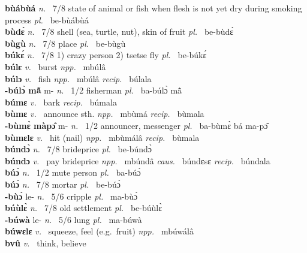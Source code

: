 {\bfseries bùábùá}  {\itshape n.~} 7/8 state of animal or fish when flesh is not yet dry during smoking process {\itshape pl.~}  be-bùábùá \\ 
{\bfseries bùdɛ́}  {\itshape n.~} 7/8 shell (sea, turtle, nut), skin of fruit {\itshape pl.~} be-bùdɛ́    \\ 
{\bfseries bùgù}  {\itshape n.~} 7/8 place {\itshape pl.~} be-bùgù    \\ 
{\bfseries búkɛ́}  {\itshape n.~} 7/8 1) crazy person 2) tsetse fly {\itshape pl.~} be-búkɛ́    \\ 
{\bfseries búlɛ}  {\itshape v.~} burst   {\itshape npp.~} mbúlâ  \\ 
{\bfseries búlɔ}  {\itshape v.~} fish   {\itshape npp.~} mbúlâ {\itshape recip.~} búlala  \\ 
{\bfseries -búlɔ̀ mã̂} m- {\itshape n.~} 1/2 fisherman {\itshape pl.~} ba-búlɔ̀ mã̂    \\ 
{\bfseries búmɛ}  {\itshape v.~} bark   {\itshape recip.~} búmala  \\ 
{\bfseries bùmɛ}  {\itshape v.~} announce sth.   {\itshape npp.~} mbùmá {\itshape recip.~} bùmala  \\ 
{\bfseries -bùmɛ̀ màpɔ̂} m- {\itshape n.~} 1/2 announcer, messenger {\itshape pl.~} ba-bùmɛ̀ bá ma-pɔ̂    \\ 
{\bfseries bùmɛlɛ}  {\itshape v.~} hit (nail)   {\itshape npp.~} mbùmálâ {\itshape recip.~} bùmala  \\ 
{\bfseries búndɔ̀}  {\itshape n.~} 7/8 brideprice {\itshape pl.~} be-búndɔ̀    \\ 
{\bfseries búndɔ}  {\itshape v.~} pay brideprice   {\itshape npp.~} mbúndâ {\itshape caus.~} búndɛsɛ {\itshape recip.~} búndala  \\ 
{\bfseries búɔ̀}  {\itshape n.~} 1/2 mute person {\itshape pl.~} ba-búɔ̀    \\ 
{\bfseries búɔ̀}  {\itshape n.~} 7/8 mortar {\itshape pl.~} be-búɔ̀    \\ 
{\bfseries -bùɔ́} le- {\itshape n.~} 5/6 cripple {\itshape pl.~} ma-bùɔ́    \\ 
{\bfseries búùlɛ̀}  {\itshape n.~} 7/8 old settlement {\itshape pl.~} be-búùlɛ̀    \\ 
{\bfseries -búwà} le- {\itshape n.~} 5/6 lung {\itshape pl.~} ma-búwà    \\ 
{\bfseries búwɛlɛ}  {\itshape v.~} squeeze, feel (e.g.\ fruit)   {\itshape npp.~} mbúwálâ  \\ 
{\bfseries bvû}  {\itshape v.~} think, believe  \\ 
